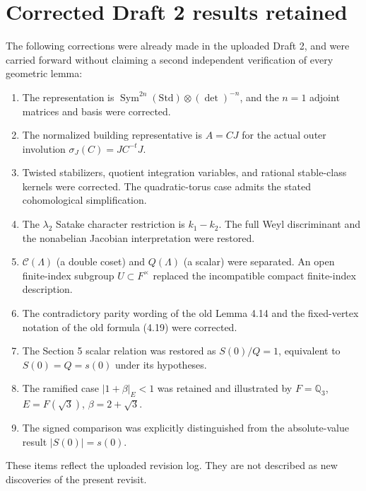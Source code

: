 \documentclass[12pt,letterpaper]{amsart}
\begin{document}
\section{Corrected Draft 2 results retained}
The following corrections were already made in the uploaded Draft 2,
and were carried forward without claiming a second independent
verification of every geometric lemma:
\begin{enumerate}
\item The representation is $\operatorname{Sym}^{2n}(\mathrm{Std})\otimes
(\det)^{-n}$, and the $n=1$ adjoint matrices and basis were corrected.
\item The normalized building representative is $A=CJ$ for the actual
outer involution $\sigma_J(C)=JC^{-t}J$.
\item Twisted stabilizers, quotient integration variables, and rational
stable-class kernels were corrected. The quadratic-torus case admits
the stated cohomological simplification.
\item The $\lambda_2$ Satake character restriction is $k_1-k_2$.
The full Weyl discriminant and the nonabelian Jacobian interpretation
were restored.
\item $\mathcal C(\Lambda)$ (a double coset) and $Q(\Lambda)$ (a
scalar) were separated. An open finite-index subgroup $U\subset F^\times$
replaced the incompatible compact finite-index description.
\item The contradictory parity wording of the old Lemma 4.14 and the
fixed-vertex notation of the old formula (4.19) were corrected.
\item The Section 5 scalar relation was restored as
$S(0)/Q=1$, equivalent to $S(0)=Q=s(0)$ under its hypotheses.
\item The ramified case $|1+\beta|_E<1$ was retained and illustrated
by $F=\mathbb Q_3$, $E=F(\sqrt 3)$, $\beta=2+\sqrt3$.
\item The signed comparison was explicitly distinguished from the
absolute-value result $|S(0)|=s(0)$.
\end{enumerate}
These items reflect the uploaded revision log. They are not described
as new discoveries of the present revisit.
\end{document}
